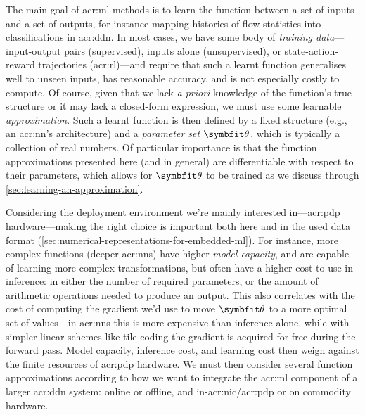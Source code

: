 The main goal of \gls{acr:ml} methods is to learn the function between a set of inputs and a set of outputs, for instance mapping histories of flow statistics into classifications in \gls{acr:ddn}.
In most cases, we have some body of \emph{training data}---input-output pairs (supervised), inputs alone (unsupervised), or state-action-reward trajectories (\gls{acr:rl})---and require that such a learnt function generalises well to unseen inputs, has reasonable accuracy, and is not especially costly to compute.
Of course, given that we lack \emph{a priori} knowledge of the function's true structure or it may lack a closed-form expression, we must use some learnable \emph{approximation}.
Such a learnt function is then defined by a fixed structure (e.g., an \gls{acr:nn}'s architecture) and a \emph{parameter set} $\wvec{}$, which is typically a collection of real numbers.
Of particular importance is that the function approximations presented here (and in general) are differentiable with respect to their parameters, which allows for $\wvec{}$ to be trained as we discuss through \cref{sec:learning-an-approximation}.

Considering the deployment environment we're mainly interested in---\gls{acr:pdp} hardware---making the right choice is important both here and in the used data format (\cref{sec:numerical-representations-for-embedded-ml}).
For instance, more complex functions (deeper \glspl{acr:nn}) have higher \emph{model capacity}, and are capable of learning more complex transformations, but often have a higher cost to use in inference: in either the number of required parameters, or the amount of arithmetic operations needed to produce an output.
This also correlates with the cost of computing the gradient we'd use to move $\wvec{}$ to a more optimal set of values---in \glspl{acr:nn} this is more expensive than inference alone, while with simpler linear schemes like tile coding the gradient is acquired for free during the forward pass.
Model capacity, inference cost, and learning cost then weigh against the finite resources of \gls{acr:pdp} hardware.
We must then consider several function approximations according to how we want to integrate the \gls{acr:ml} component of a larger \gls{acr:ddn} system: online or offline, and in-\gls{acr:nic}/\gls{acr:pdp} or on commodity hardware.




